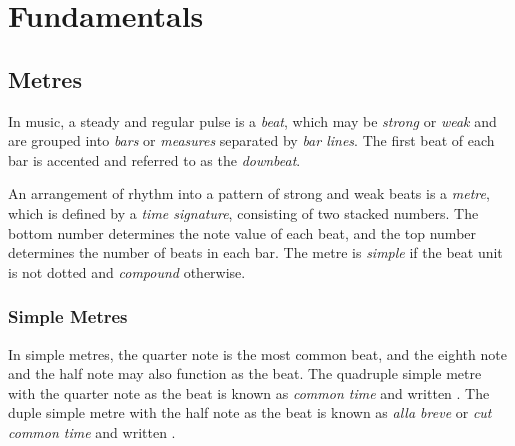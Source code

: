 


\usepackage{lilyglyphs}
\usepackage{lyluatex}


\section{Fundamentals}

\subsection{Metres}

In music, a steady and regular pulse is a \emph{beat}, which may be \emph{strong} or \emph{weak} and are grouped into
\emph{bars} or \emph{measures} separated by \emph{bar lines}. The first beat of each bar is accented and referred to as
the \emph{downbeat}.

An arrangement of rhythm into a pattern of strong and weak beats is a \emph{metre}, which is defined by a \emph{time
signature}, consisting of two stacked numbers. The bottom number determines the note value of each beat, and the top
number determines the number of beats in each bar. The metre is \emph{simple} if the beat unit is not dotted and
\emph{compound} otherwise.

\subsubsection{Simple Metres}

In simple metres, the quarter note is the most common beat, and the eighth note and the half note may also function as
the beat. The quadruple simple metre with the quarter note as the beat  is known as \emph{common
time} and written \lilyTimeC. The duple simple metre with the half note as the beat  is known as
\emph{alla breve} or \emph{cut common time} and written \lilyTimeCHalf.

\Edc
